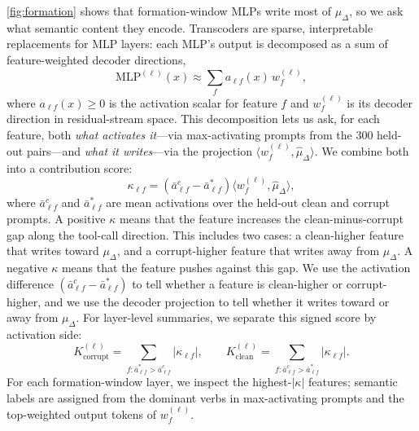 \documentclass{article}
\begin{document}
\autoref{fig:formation} shows that formation-window MLPs write most of
$\mu_\Delta$, so we ask what semantic content they encode.
Transcoders \citep{dunefsky2024transcoders} are sparse, 
interpretable replacements for MLP layers: 
each MLP's output is decomposed as a sum of feature-weighted decoder directions,
\begin{equation}
  \text{MLP}^{(\ell)}(x) \approx \textstyle\sum_f a_{\ell f}(x)\, w_f^{(\ell)},
  \label{eq:transcoder}
\end{equation}
where $a_{\ell f}(x) \geq 0$ is the activation scalar for feature $f$ 
and $w_f^{(\ell)}$ is its decoder direction in residual-stream space.
This decomposition lets us ask, for each feature, 
both \emph{what activates it}---via max-activating prompts 
from the 300 held-out pairs---and \emph{what it writes}---via 
the projection $\langle w_f^{(\ell)}, \hat{\mu}_\Delta \rangle$.
We combine both into a contribution score:
\begin{equation}
  \kappa_{\ell f} = (\bar{a}^c_{\ell f} - \bar{a}^*_{\ell f})\langle w_f^{(\ell)}, \hat{\mu}_\Delta \rangle,
  \label{eq:kappa}
\end{equation}
where $\bar{a}^c_{\ell f}$ and $\bar{a}^*_{\ell f}$ are mean activations over the held-out clean and corrupt prompts.
A positive $\kappa$ means that the feature increases the clean-minus-corrupt
gap along the tool-call direction. This includes two cases: a clean-higher
feature that writes toward $\mu_\Delta$, and a corrupt-higher feature that
writes away from $\mu_\Delta$. A negative $\kappa$ means that the feature
pushes against this gap. We use the activation difference
$(\bar{a}^c_{\ell f}-\bar{a}^*_{\ell f})$ to tell whether a feature is
clean-higher or corrupt-higher, and we use the decoder projection to tell
whether it writes toward or away from $\mu_\Delta$.
For layer-level summaries, we separate this signed score by activation side:
\[
K_{\mathrm{corrupt}}^{(\ell)}
= \sum_{f:\bar{a}^*_{\ell f}>\bar{a}^c_{\ell f}} |\kappa_{\ell f}|,
\qquad
K_{\mathrm{clean}}^{(\ell)}
= \sum_{f:\bar{a}^c_{\ell f}>\bar{a}^*_{\ell f}} |\kappa_{\ell f}|.
\]
For each formation-window layer, we inspect the highest-$|\kappa|$ features;
semantic labels are assigned from the dominant verbs in max-activating
prompts and the top-weighted output tokens of $w_f^{(\ell)}$.
\end{document}
